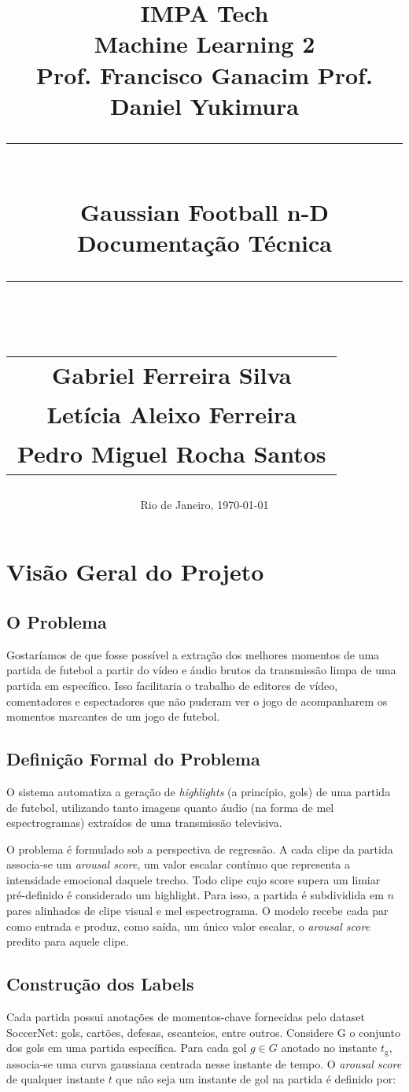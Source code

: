 \documentclass[12pt, a4paper]{article}
\title{
    \vspace{-2cm}
    \Large \textbf{IMPA Tech} \\[0.5cm]
    \large Machine Learning 2 \\
    \small Prof. Francisco Ganacim \quad Prof. Daniel Yukimura \\[1.5cm]
    \rule{\linewidth}{0.5pt} \\[0.4cm]
    {\Huge \textbf{Gaussian Football n-D}} \\[0.2cm]
    \large Documentação Técnica \\
    \rule{\linewidth}{0.5pt} \\[1.5cm]
    \normalsize
    \begin{tabular}{c}
        Gabriel Ferreira Silva \\[0.3cm]
        Letícia Aleixo Ferreira \\[0.3cm]
        Pedro Miguel Rocha Santos
    \end{tabular}
}
\date{\vspace{1cm} Rio de Janeiro, \today}
\begin{document}
\maketitle
\thispagestyle{empty}
\newpage

\tableofcontents
\newpage


\section{Visão Geral do Projeto}
\label{sec:visao_geral}

\subsection{O Problema}

Gostaríamos de que fosse possível a extração dos melhores momentos de uma partida de futebol a partir do vídeo e áudio brutos da transmissão limpa de uma partida em específico. Isso facilitaria o trabalho de editores de vídeo, comentadores e espectadores que não puderam ver o jogo de acompanharem os momentos marcantes de um jogo de futebol.

\subsection{Definição Formal do Problema}

O sistema automatiza a geração de \textit{highlights} (a princípio, gols) de uma partida de futebol, utilizando tanto imagens quanto áudio (na forma de mel espectrogramas) extraídos de uma transmissão televisiva.

O problema é formulado sob a perspectiva de regressão. A cada clipe da partida associa-se um \textit{arousal score}, um valor escalar contínuo que representa a intensidade emocional daquele trecho. Todo clipe cujo score supera um limiar pré-definido é considerado um highlight. Para isso, a partida é subdividida em $n$ pares alinhados de clipe visual e mel espectrograma. O modelo recebe cada par como entrada e produz, como saída, um único valor escalar, o \textit{arousal score} predito para aquele clipe.

\subsection{Construção dos Labels}

Cada partida possui anotações de momentos-chave fornecidas pelo dataset SoccerNet: gols, cartões, defesas, escanteios, entre outros. Considere G o conjunto dos gols em uma partida específica. Para cada gol $g \in G$ anotado no instante $t_{\text{g}}$, associa-se uma curva gaussiana centrada nesse instante de tempo. O \textit{arousal score} de qualquer instante $t$ que não seja um instante de gol na partida é definido por:
\end{document}
